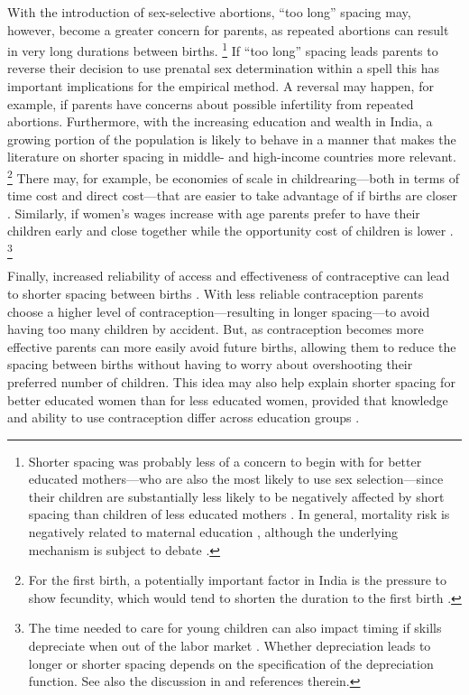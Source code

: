 \documentclass[12pt,letterpaper]{article}
\begin{document}
With the introduction of sex-selective abortions, ``too long'' spacing 
may, however, become a greater concern for parents, as 
repeated abortions can result in very long durations between births.%
\footnote{
Shorter spacing was probably less of a concern to begin with for
better educated mothers---who are also the most likely to use 
sex selection---since their children are substantially less likely 
to be negatively affected by short spacing than children of less 
educated mothers \citep{Whitworth2002}.
In general, mortality risk is negatively related to maternal
education \citep[for India, see, for example,][]{Tulasidhar1993},
although the underlying mechanism is subject
to debate \citep{Kovsted2002}.
}
If ``too long'' spacing leads parents to reverse their decision to use
prenatal sex determination within a spell this has important implications 
for the empirical method.
A reversal may happen, for example, if parents have concerns about possible 
infertility from repeated abortions.
Furthermore, with the increasing education and wealth in India, a growing 
portion of the population is likely to behave in a manner that makes the 
literature on shorter spacing in middle- and high-income countries more relevant.%
\footnote{
For the first birth, a potentially important factor in India is 
the pressure to show fecundity, which would tend to shorten
the duration to the first birth \citep{dyson83,Sethuraman2007,Dommaraju2009}.
}
There may, for example, be economies of scale in childrearing---both
in terms of time cost and direct cost---that are easier to
take advantage of if births are closer \citep[p 947]{Newman1984}.
Similarly, if women's wages increase with age parents prefer
to have their children early and close together while 
the opportunity cost of children is lower \citep{Heckman1976}.%
\footnote{
The time needed to care for young children can also impact 
timing if skills depreciate when out of the labor market \citep{Happel1984}.
Whether depreciation leads to longer or shorter spacing depends
on the specification of the depreciation function.
See also the discussion in \citet[p 315]{Hotz1997}
and references therein.
}

Finally, increased reliability of access and effectiveness of
contraceptive can lead to shorter spacing between births 
\citep{Keyfitz1971,Heckman1976}.
With less reliable contraception parents choose a higher level of 
contraception---resulting in longer spacing---to avoid having 
too many children by accident.
But, as contraception becomes more effective parents can more
easily avoid future births, allowing them to reduce the spacing 
between births without having to worry about overshooting their 
preferred number of children.
This idea may also help explain shorter spacing for better 
educated women than for less educated women, provided that   
knowledge and ability to use contraception differ
across education groups \citep{Tulasidhar1993,Whitworth2002}.
\end{document}
